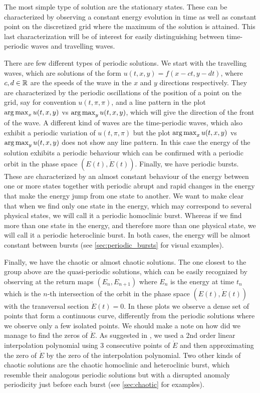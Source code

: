 \documentclass[twoside]{article}
\begin{document}
The most simple type of solution are the stationary states. These can be characterized by observing a constant energy evolution in time as well as constant point on the discretized grid where the maximum of the solution is attained. This last characterization will be of interest for easily distinguishing between time-periodic waves and travelling waves.

There are few different types of periodic solutions. We start with the travelling waves, which are solutions of the form $u(t,x,y) = f(x-ct,y-dt)$, where $c,d\in\mathbb{R}$ are the speeds of the wave in the $x$ and $y$ directions respectively. They are characterized by the periodic oscillations of the position of a point on the grid, say for convention $u(t,\pi,\pi)$, and a line pattern in the plot $\operatorname*{arg\,max}_x u(t,x,y)$ vs $\operatorname*{arg\,max}_y u(t,x,y)$, which will give the direction of the front of the wave. A different kind of waves are the time-periodic waves, which also exhibit a periodic variation of $u(t,\pi,\pi)$ but the plot $\operatorname*{arg\,max}_x u(t,x,y)$ vs $\operatorname*{arg\,max}_y u(t,x,y)$ does not show any line pattern. In this case the energy of the solution exhibits a periodic behaviour which can be confirmed with a periodic orbit in the phase space $(E(t), \dot{E}(t))$. Finally, we have periodic bursts. These are characterized by an almost constant behaviour of the energy between one or more states together with periodic abrupt and rapid changes in the energy that make the energy jump from one state to another. We want to make clear that when we find only one state in the energy, which may correspond to several physical states, we will call it a periodic homoclinic burst. Whereas if we find more than one state in the energy, and therefore more than one physical state, we will call it a periodic heteroclinic burst. In both cases, the energy will be almost constant between bursts (see \cref{sec:periodic_bursts} for visual examples).

Finally, we have the chaotic or almost chaotic solutions. The one closest to the group above are the quasi-periodic solutions, which can be easily recognized by observing at the return maps $(E_n,E_{n+1})$ where $E_n$ is the energy at time $t_n$ which is the $n$-th intersection of the orbit in the phase space $(E(t), \dot{E}(t))$ with the transversal section $\dot{E}(t)=0$. In these plots we observe a dense set of points that form a continuous curve, differently from the periodic solutions where we observe only a few isolated points. We should make a note on how did we manage to find the zeros of $\dot{E}$. As suggested in \cite{Kalogirou2015}, we used a 2nd order linear interpolation polynomial using 3 consecutive points of $\dot{E}$ and then approximating the zero of $\dot{E}$ by the zero of the interpolation polynomial. Two other kinds of chaotic solutions are the chaotic homoclinic and heteroclinic burst, which resemble their analogous periodic solutions but with a disrupted anomaly periodicity just before each burst (see \cref{sec:chaotic} for examples).
\end{document}
